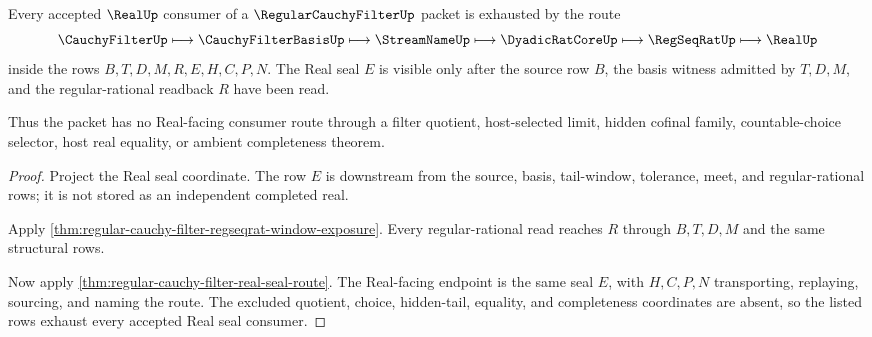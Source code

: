 \begin{theorem}
\label{thm:regular-cauchy-filter-real-seal-consumer-exhaustion}
Every accepted $\RealUp$ consumer of a $\RegularCauchyFilterUp$ packet is exhausted by the route
$$
\CauchyFilterUp \longmapsto \CauchyFilterBasisUp \longmapsto \StreamNameUp \longmapsto \DyadicRatCoreUp \longmapsto \RegSeqRatUp \longmapsto \RealUp
$$
inside the rows $B,T,D,M,R,E,H,C,P,N$. The Real seal $E$ is visible only after the source row $B$, the basis witness admitted by $T,D,M$, and the regular-rational readback $R$ have been read.

Thus the packet has no Real-facing consumer route through a filter quotient, host-selected limit, hidden cofinal family, countable-choice selector, host real equality, or ambient completeness theorem.
\end{theorem}
\begin{proof}
Project the Real seal coordinate. The row $E$ is downstream from the source, basis, tail-window, tolerance, meet, and regular-rational rows; it is not stored as an independent completed real.

Apply \autoref{thm:regular-cauchy-filter-regseqrat-window-exposure}. Every regular-rational read reaches $R$ through $B,T,D,M$ and the same structural rows.

Now apply \autoref{thm:regular-cauchy-filter-real-seal-route}. The Real-facing endpoint is the same seal $E$, with $H,C,P,N$ transporting, replaying, sourcing, and naming the route. The excluded quotient, choice, hidden-tail, equality, and completeness coordinates are absent, so the listed rows exhaust every accepted Real seal consumer.
\end{proof}

